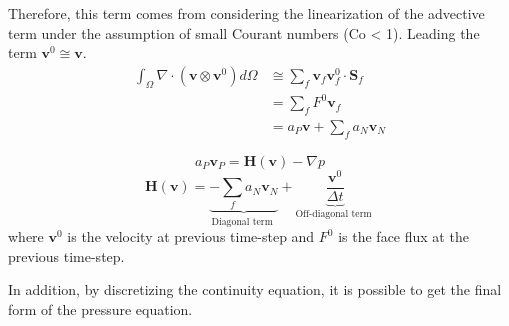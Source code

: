 \noindent Therefore, this term comes from considering the linearization of the advective term under the assumption of small Courant numbers (Co < 1). Leading the term $\textbf{v}^{0}\cong\textbf{v}$. 
\begin{equation}
	\begin{aligned}
	\int_{\Omega} \nabla \cdot\left(\textbf{v} \otimes \textbf{v}^{0}\right) d \Omega & \cong \sum_{f} \textbf{v}_{f} \textbf{v}_{f}^{0} \cdot \textbf{S}_{f} \\
	&=\sum_{f} F^{0} \textbf{v}_{f} \\
	&=a_{P} \textbf{v}+\sum_{f} a_{N} \textbf{v}_{N}
	\end{aligned}
	\label{3.15}
\end{equation}

\begin{equation}
	a_{P} \textbf{v}_{P}=\textbf{H}(\textbf{v})-\nabla p
	\label{3.16}
\end{equation}
\begin{equation}
	\textbf{H}(\textbf{v})=\underbrace{-\sum_{f} a_{N} \textbf{v}_{N}}_{\text {Diagonal term }}+\underbrace{\frac{\textbf{v}^{0}}{\Delta t}}_{\text {Off-diagonal term }}
	\label{3.17}
\end{equation}
where $\textbf{v}^{0}$ is the velocity at previous time-step and $F^{0}$ is the face flux at the previous time-step.

\noindent In addition, by discretizing the continuity equation, it is possible to get the final form of the pressure equation.

